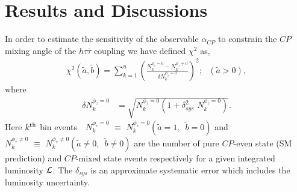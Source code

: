 \documentclass[pdftex,twocolumn,epjc3]{svjour3}          %
\begin{document}
\section{Results and Discussions}
\label{Results}
%
In order to estimate the sensitivity of the observable $\alpha_{CP}$ to constrain the $CP$ mixing angle of the $h\tau{\bar\tau}$ coupling we have defined $\chi^2$ as, 
%
\begin{eqnarray}
\chi^2 \left(\tilde{a},\tilde{b}\right) =\sum_{k = 1}^{n}\left(\frac{ N_k^{\phi_\tau=0}  -  N_k^{\phi_\tau\ne 0}}{\delta  N_k^{\phi_\tau=0}} \right)^2;    \,\,\,\, \left(\tilde a > 0\right),
\label{phicp_sensitivity_chisq}
\end{eqnarray}
where
\begin{eqnarray}
\delta  N_k^{\phi_\tau=0} &= \sqrt{ N_k^{\phi_\tau=0} \left(1 + \delta_{sys}^2 \,\, N_k^{\phi_\tau=0} \right)}.
\end{eqnarray}
Here  $k^{\rm th}$ bin events $\,\,\,\,N_k^{\phi_\tau=0}\,\,\equiv\,\, N_k^{\phi_\tau=0} \left(\tilde{a}=1,\,\,\,\tilde{b}=0\right)$ and $N_k^{\phi_\tau\ne 0}\,\,\equiv\,\, N_k^{\phi_\tau\ne 0}\left(\tilde{a}\ne 0,\,\,\,\tilde{b}\ne 0\right)$ are  the number of  pure $CP$-even state (SM prediction) and $CP$-mixed state events respectively for a given  integrated luminosity $\cal L$. The $\delta_{sys}$  is an approximate  systematic error which includes the luminosity uncertainty. 
%
\end{document}
